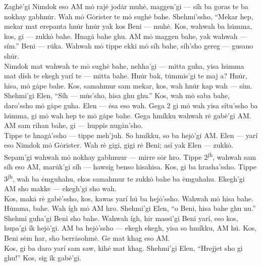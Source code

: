 \documentclass{article}[10pt]
\begin{document}
Zagh\.{e}'gi Nimdok eso AM m\.{o} raj\.{e} jod\.{a}r muh\.{e}, maggen'gi --- s\'{i}h ba goras te ba nokhay gabhn\.{u}r. Wah m\.{o} G\.{o}rister te m\.{o} sugh\.{e} bahe. Shehmi'ssho, ``Mekar hep, mekar mat erepanta hn\.{u}r hn\.{u}r yak kos Beni --- muh\.{e}. Kos, wahwah ba h\.{u}mma, kos, gi --- zukk\.{o} bahe. Hnag\.{a} bahe ghu. AM m\.{o} maggen bahe, yak wahwah --- s\'{i}m.'' Beni --- r\.{u}ka. Wahwah m\.{o} tippe ekki m\.{o} s\'{i}h bahe, s\'{i}h'sho gereg --- gusano sh\.{u}r.\\

Nimdok mat wahwah te m\.{o} sugh\.{e} bahe, nehha'gi --- mitta guha, yisa h\.{u}mma mat d\'{i}sh te ekegh yar\'{i} te --- mitta bahe. Hn\.{u}r bak, t\.{u}mmis'gi te maj a? Hn\.{u}r, hisa, m\.{o} g\.{a}pe bahe. Kos, samahmur sam mekar, kos, wah hn\.{u}r kap wah --- s\'{i}m. Shehmi'gi Elen, ``S\'{i}h --- m\.{u}s'sho, hisa ghu ghu.'' Kos, wah m\.{o} saba bahe, daro'ssho m\.{o} g\.{a}pe guha. Elen --- \.{e}sa eso wah. Gega 2 gi m\.{o} wah yisa s\'{i}tu'ssho ba h\.{u}mma, gi m\.{o} wah hep te m\.{o} g\.{a}pe bahe. Gega hm\'{i}kku wahwah r\.{e} gab\.{e}'gi AM. AM sam rihan bahe, gi --- huppis nug\.{a}n'sho.\\

Tippe te hnag\.{a}'ssho --- tippe meh'juh. So hm\'{i}kku, so ba hej\.{o}'gi AM. Elen --- yar\'{i} eso Nimdok m\.{o} G\.{o}rister. Wah r\.{e} gigi, gigi r\.{e} Beni; as\'{i} yak Elen --- zukk\.{o}. Sepam'gi wahwah m\.{o} nokhay gabhnuur --- mirre s\.{o}r hro. Tippe 2\textsuperscript{jh}, wahwah sam s\'{i}h eso AM, mar\.{u}k'gi s\'{i}h --- hawsig benso hisahisa. Kos, gi ba hrasha'ssho. Tippe 3\textsuperscript{jh}, wah ba \.{e}mguhahu, ekos samahmur te zukk\.{o} bahe ba \.{e}mguhahu. Ekegh'gi AM sho makke --- ekegh'gi sho wah.\\

Kos, mak\.{a} r\.{e} gab\.{e}'ssho, kos, kawas yar\'{i} h\.{u} ba hej\.{o}'ssho. Wahwah m\.{o} hisa bahe. H\.{u}mma, bahe. Wah \'{i}gh m\.{o} AM hro. Shehmi'gi Elen, ``o Beni, hisa bahe ghu nu.'' Shehmi guha'gi Beni sho bahe. Wahwah \'{i}gh, hir massi'gi Beni yar\'{i}, eso kos, hupa'gi \'{i}k hej\.{o}'gi. AM ba hej\.{o}'ssho --- ekegh ekegh, yisa so hm\'{i}kku, AM  h\.{u}. Kos, Beni s\.{e}m har, sho berr\.{a}sohm\.{e}. Ge mat khag eso AM.\\

Kos, gi ba daro yar\'{i} sam saw, kih\.{e} mat khag. Shehmi'gi Elen, ``Hrejjet sho gi ghu!'' Kos, sig \'{i}k gab\.{e}'gi.\\
\end{document}
